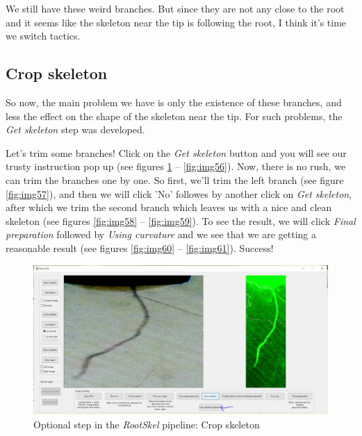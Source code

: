 We still have these weird branches. But since they are not any close to the root and it seems like the skeleton near the tip is following the root, I think it's time we switch tactics.

\subsection{Crop skeleton}

So now, the main problem we have is only the existence of these branches, and less the effect on the shape of the skeleton near the tip. For such problems, the \textit{Get skeleton} step was developed. 

Let's trim some branches! Click on the \textit{Get skeleton} button and you will see our trusty instruction pop up (see figures \ref{fig:img55} -- \ref{fig:img56}).
Now, there is no rush, we can trim the branches one by one. So first, we'll trim the left branch (see figure \ref{fig:img57}), and then we will click 'No' followes by another click on \textit{Get skeleton}, after which we trim the second branch which leaves us with a nice and clean skeleton (see figures \ref{fig:img58} -- \ref{fig:img59}).
To see the result, we will click \textit{Final preparation} followed by \textit{Using curvature} and we see that we are getting a reasonable result (see figures \ref{fig:img60} -- \ref{fig:img61}). Success!


\begin{figure}[H]
	\centering
	\includegraphics[width=\textwidth]{../Figures/manual/optionalD1.jpg}
	\caption{Optional step in the \textit{RootSkel} pipeline: Crop skeleton}
	\label{fig:img55}
\end{figure}

